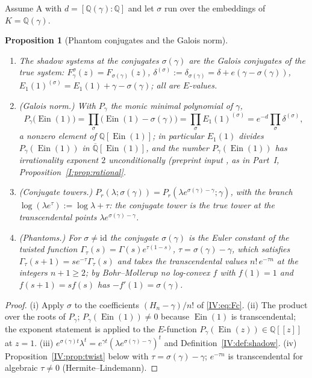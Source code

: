\documentclass[11pt,a4paper]{article}
\newcommand{\Q}{\mathbb Q}
\newcommand{\Qbar}{\overline{\mathbb Q}}
\newcommand{\Ein}{\operatorname{Ein}}
\newtheorem{proposition}[theorem]{Proposition}
\theoremstyle{definition}
\theoremstyle{remark}
\numberwithin{equation}{section}
\begin{document}
Assume $\mathrm A$ with $d=[\Q(\gamma):\Q]$ and let $\sigma$ run over the embeddings of
$K=\Q(\gamma)$.

\begin{proposition}[Phantom conjugates and the Galois norm]\label{IV:prop:galois}
\begin{enumerate}[label=(\roman*)]
\item The shadow systems at the conjugates $\sigma(\gamma)$ are the Galois conjugates of the
true system: $F_\gamma^\sigma(z)=F_{\sigma(\gamma)}(z)$, $\delta^{(\sigma)}:=\delta_{\sigma(\gamma)}
=\delta+e(\gamma-\sigma(\gamma))$, $E_1(1)^{(\sigma)}=E_1(1)+\gamma-\sigma(\gamma)$; all are
$E$-values.
\item \textup{(Galois norm.)} With $P_\gamma$ the monic minimal polynomial of $\gamma$,
\begin{equation}\label{IV:eq:norm}
 P_\gamma\bigl(\Ein(1)\bigr)=\prod_\sigma\bigl(\Ein(1)-\sigma(\gamma)\bigr)=\prod_\sigma E_1(1)^{(\sigma)}
 =e^{-d}\prod_\sigma\delta^{(\sigma)} ,
\end{equation}
a nonzero element of $\Q[\Ein(1)]$; in particular $E_1(1)$ divides
$P_\gamma(\Ein(1))$ in $\Qbar[\Ein(1)]$, and the number $P_\gamma(\Ein(1))$ has
irrationality exponent $2$ unconditionally \textup{(preprint input \cite{FRexponent}, as in
Part~I, Proposition~\ref{I:prop:rational}}.
\item \textup{(Conjugate towers.)} $P_r(\lambda;\sigma(\gamma))=P_r(\lambda e^{\sigma(\gamma)-\gamma};\gamma)$,
with the branch $\log(\lambda e^\tau):=\log\lambda+\tau$: the conjugate tower is the true
tower at the transcendental points $\lambda e^{\sigma(\gamma)-\gamma}$.
\item \textup{(Phantoms.)} For $\sigma\ne\mathrm{id}$ the conjugate $\sigma(\gamma)$ is the
Euler constant of the twisted function $\Gamma_{\tau}(s)=\Gamma(s)e^{\tau(1-s)}$,
$\tau=\sigma(\gamma)-\gamma$, which satisfies $\Gamma_\tau(s+1)=se^{-\tau}\Gamma_\tau(s)$ and
takes the transcendental values $n!\,e^{-\tau n}$ at the integers $n+1\ge2$; by Bohr--Mollerup no
log-convex $f$ with $f(1)=1$ and $f(s+1)=sf(s)$ has $-f'(1)=\sigma(\gamma)$.
\end{enumerate}
\end{proposition}
\begin{proof}
(i) Apply $\sigma$ to the coefficients $(H_n-\gamma)/n!$ of \eqref{IV:eq:Fc}. (ii) The product
over the roots of $P_\gamma$; $P_\gamma(\Ein(1))\ne0$ because $\Ein(1)$ is transcendental;
the exponent statement is \cite[Thm.~1]{FRexponent} applied to the $E$-function
$P_\gamma(\Ein(z))\in\Q[[z]]$ at $z=1$. (iii) $e^{\sigma(\gamma)t}\lambda^t=e^{\gamma t}(\lambda e^{\sigma(\gamma)-\gamma})^t$
and Definition~\ref{IV:def:shadow}. (iv) Proposition~\ref{IV:prop:twist} below with $\tau=\sigma(\gamma)-\gamma$;
$e^{-\tau n}$ is transcendental for algebraic $\tau\ne0$ (Hermite--Lindemann).
\end{proof}
\end{document}
